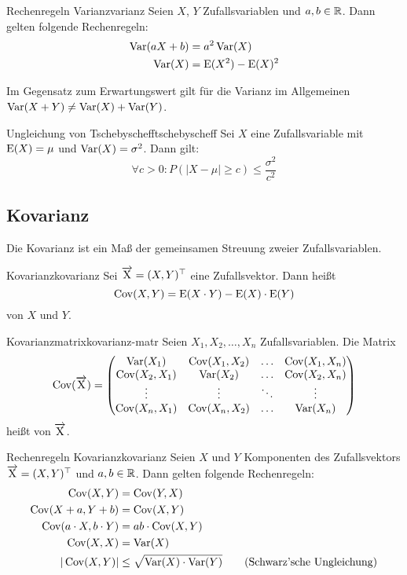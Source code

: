 \begin{theorem}{Rechenregeln Varianz}{varianz}
Seien $X$, $Y$ Zufallsvariablen und $a,b\in\mathbb{R}$. Dann gelten folgende Rechenregeln:
\begin{align*}
\operatorname{Var}(aX+b) &= a^2 \operatorname{Var}(X) \\
\operatorname{Var}(X) &= \operatorname{E}(X^2) - \operatorname{E}(X)^2
\end{align*}
\end{theorem}

Im Gegensatz zum Erwartungswert gilt für die Varianz im Allgemeinen
$\operatorname{Var}(X+Y) \ne \operatorname{Var}(X) + \operatorname{Var}(Y)$.

\begin{theorem}{Ungleichung von Tschebyscheff}{tschebyscheff}
Sei $X$ eine Zufallsvariable mit $\operatorname{E}(X) = \mu$ und $\operatorname{Var}(X) = \sigma^2$. Dann
gilt:
\[
\forall c>0: P(|X-\mu|\ge c) \le\frac{\sigma^2}{c^2}
\]
\end{theorem}


\subsection{Kovarianz}

Die Kovarianz ist ein Maß der gemeinsamen Streuung zweier Zufallsvariablen.

\begin{definition}{Kovarianz}{kovarianz}
Sei $\overrightarrow{\mathrm{X}} = (X,Y)^\top$ eine Zufallsvektor. Dann heißt
\[
\operatorname{Cov}(X,Y) = \operatorname{E}(X\cdot Y) - \operatorname{E}(X)\cdot\operatorname{E}(Y)
\]
 von $X$ und $Y$.
\end{definition}

\begin{definition}{Kovarianzmatrix}{kovarianz-matr}
Seien $X_1, X_2, \ldots, X_n$ Zufallsvariablen. Die Matrix
\[
\operatorname{Cov}(\overrightarrow{\mathrm{X}}) = \begin{pmatrix}
  \operatorname{Var}(X_1) & \operatorname{Cov}(X_1,X_2) & \ldots & \operatorname{Cov}(X_1, X_n) \\
  \operatorname{Cov}(X_2,X_1) & \operatorname{Var}(X_2)  & \ldots  & \operatorname{Cov}(X_2, X_n) \\
    \vdots  &     \vdots   &  \ddots   &    \vdots      \\
  \operatorname{Cov}(X_n,X_1) & \operatorname{Cov}(X_n,X_2) & \ldots & \operatorname{Var}(X_n)
\end{pmatrix}
\]
heißt  von $\overrightarrow{\mathrm{X}}$.
\end{definition}

\begin{theorem}{Rechenregeln Kovarianz}{kovarianz}
Seien $X$ und $Y$ Komponenten des Zufallsvektors $\overrightarrow{\mathrm{X}}=(X,Y)^\top$ und
$a,b\in\mathbb{R}$. Dann gelten folgende Rechenregeln:
\begin{align*}
\operatorname{Cov}(X, Y) &= \operatorname{Cov}(Y,X) \\
\operatorname{Cov}(X + a, Y + b) &= \operatorname{Cov}(X,Y) \\
\operatorname{Cov}(a\cdot X, b\cdot Y) &= ab\cdot\operatorname{Cov}(X,Y) \\
\operatorname{Cov}(X, X) &= \operatorname{Var}(X) \\
|\operatorname{Cov}(X,Y)| &\le \sqrt{\operatorname{Var}(X)\cdot\operatorname{Var}(Y)} \tag{Schwarz'sche Ungleichung}
\end{align*}
\end{theorem}


